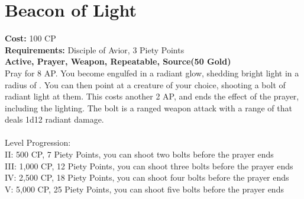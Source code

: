 \section{Beacon of Light}\label{prayer:beaconOfLight}
\textbf{Cost:} 100 CP\\
\textbf{Requirements:} Disciple of Avior, 3 Piety Points \\
\textbf{Active, Prayer, Weapon, Repeatable, Source(50 Gold)}\\
Pray for 8 AP. You become engulfed in a radiant glow, shedding bright light in a radius of .
You can then point at a creature of your choice, shooting a bolt of radiant light at them.
This costs another 2 AP, and ends the effect of the prayer, including the lighting.
The bolt is a ranged weapon attack with a range of  that deals 1d12 radiant damage.\\
\\
Level Progression:\\
II: 500 CP, 7 Piety Points, you can shoot two bolts before the prayer ends\\
III: 1,000 CP, 12 Piety Points, you can shoot three bolts before the prayer ends\\
IV: 2,500 CP, 18 Piety Points, you can shoot four bolts before the prayer ends\\
V: 5,000 CP, 25 Piety Points, you can shoot five bolts before the prayer ends\\